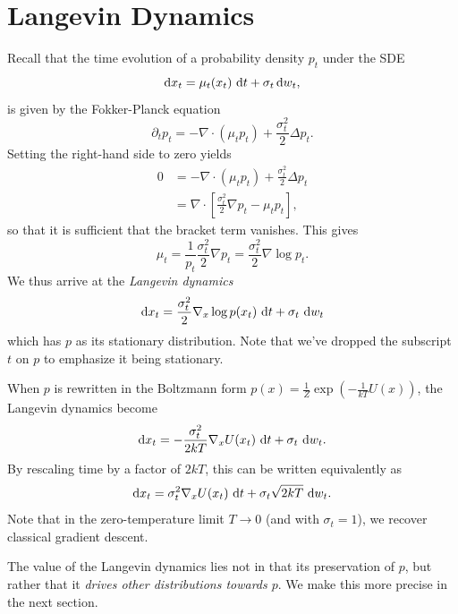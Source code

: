 \documentclass{scrartcl}
\begin{document}
\section{Langevin Dynamics}
\label{sec:langevin}

Recall that the time evolution of a probability density $p_t$ under the SDE
\begin{equation}
\d x_t = \mu_t(x_t)\, \d t + \sigma_t \d w_t,
\end{equation}
is given by the Fokker-Planck equation
\begin{equation}
    \partial_t p_t = - \nabla \cdot (\mu_t p_t) + \frac{\sigma_t^2}{2} \Delta p_t.
\end{equation}
Setting the right-hand side to zero yields
\begin{align*}
    0 &= - \nabla \cdot (\mu_t p_t) + \frac{\sigma_t^2}{2} \Delta p_t\\
      &= \nabla \cdot \left[\frac{\sigma_t^2}{2} \nabla p_t - \mu_t p_t\right],
\end{align*}
so that it is sufficient that the bracket term vanishes. This gives
\begin{equation}
    \mu_t = \frac{1}{p_t} \frac{\sigma_t^2}{2} \nabla p_t = \frac{\sigma_t^2}{2} \nabla \log p_t.
\end{equation}
We thus arrive at the \textit{Langevin dynamics}
\begin{equation}
    \d x_t = \frac{\sigma_t^2}{2} \nabla_x \log p(x_t)\, \d t + \sigma_t\, \d w_t
\end{equation}
which has $p$ as its stationary distribution. Note that we've dropped the subscript $t$ on $p$ to emphasize it being stationary.

\begin{remarkbox}
When $p$ is rewritten in the Boltzmann form $p(x) = \frac{1}{Z} \exp\left(-\frac{1}{kT} U(x)\right)$, the Langevin dynamics become
\begin{equation}
    \d x_t = - \frac{\sigma_t^2}{2kT} \nabla_x U(x_t)\, \d t + \sigma_t\, \d w_t.
\end{equation}
By rescaling time by a factor of $2kT$, this can be written equivalently as
\begin{equation}
    \d x_t = \sigma_t^2\nabla_x U(x_t)\, \d t + \sigma_t\sqrt{2kT}\, \d w_t.
\end{equation}
Note that in the zero-temperature limit $T \to 0$ (and with $\sigma_t = 1$), we recover classical gradient descent.
\end{remarkbox}
The value of the Langevin dynamics lies not in that its preservation of $p$, but rather that it \textit{drives other distributions towards $p$}. We make this more precise in the next section.
\end{document}
